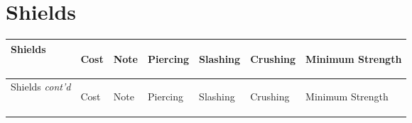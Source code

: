 \documentclass[twoside]{book}
\begin{document}
    

\section{Shields}
    
\begin{longtable}{p{1.25in}llp{3em}p{3em}p{3em}p{3em}} 
  Shields
  &
  \begin{turn}{70}{Cost}\end{turn}
          
  &
  \begin{turn}{70}{Note}\end{turn}
          
  &
  \begin{turn}{70}{Piercing}\end{turn}
          
  &
  \begin{turn}{70}{Slashing}\end{turn}
          
  &
  \begin{turn}{70}{Crushing}\end{turn}
          
  &
  \begin{turn}{70}{Minimum Strength}\end{turn}
          
  \\
  \hline
  \hline
  \endfirsthead
  Shields \textit{cont'd}
        
  &
  \begin{turn}{70}{Cost}\end{turn}
          
  &
  \begin{turn}{70}{Note}\end{turn}
          
  &
  \begin{turn}{70}{Piercing}\end{turn}
          
  &
  \begin{turn}{70}{Slashing}\end{turn}
          
  &
  \begin{turn}{70}{Crushing}\end{turn}
          
  &
  \begin{turn}{70}{Minimum Strength}\end{turn}
          

\end{longtable}
\end{document}
